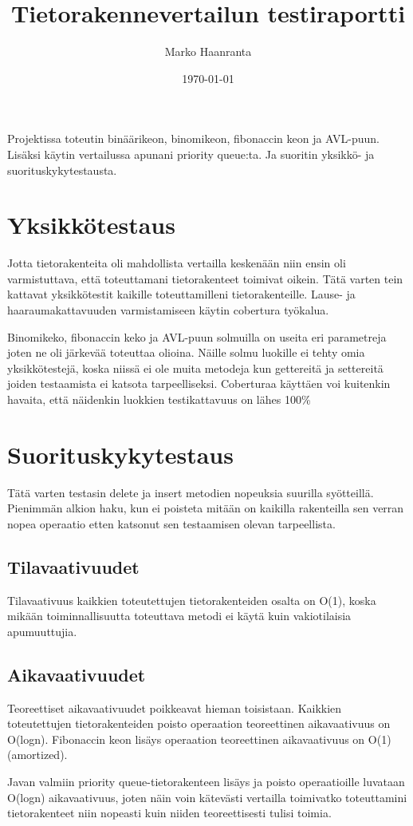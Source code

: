 \documentclass[11pt,a4paper]{article}
\author{Marko Haanranta}
\date{\today}
\title{Tietorakennevertailun testiraportti}
\begin{document}
\maketitle
Projektissa toteutin binäärikeon, binomikeon, fibonaccin keon ja AVL-puun. Lisäksi käytin vertailussa apunani priority queue:ta. 
Ja suoritin yksikkö- ja suorituskykytestausta.
\section{Yksikkötestaus}
Jotta tietorakenteita oli mahdollista vertailla keskenään niin ensin oli varmistuttava, että toteuttamani tietorakenteet toimivat oikein. Tätä varten tein kattavat yksikkötestit kaikille toteuttamilleni tietorakenteille. Lause- ja haaraumakattavuuden varmistamiseen käytin cobertura työkalua.

Binomikeko, fibonaccin keko ja AVL-puun solmuilla on useita eri parametreja joten ne oli järkevää toteuttaa olioina. Näille solmu luokille ei tehty omia yksikkötestejä, koska niissä ei ole muita metodeja kun gettereitä ja settereitä joiden testaamista ei katsota tarpeelliseksi. Coberturaa käyttäen voi kuitenkin havaita, että näidenkin luokkien testikattavuus on lähes 100\%
\section{Suorituskykytestaus}
Tätä varten testasin delete ja insert metodien nopeuksia suurilla syötteillä. Pienimmän alkion haku, kun ei poisteta mitään on kaikilla rakenteilla sen verran nopea operaatio etten katsonut sen testaamisen olevan tarpeellista.
\subsection{Tilavaativuudet}
Tilavaativuus kaikkien toteutettujen tietorakenteiden osalta on O(1), koska mikään toiminnallisuutta toteuttava metodi ei käytä kuin vakiotilaisia apumuuttujia.
\subsection{Aikavaativuudet}
Teoreettiset aikavaativuudet poikkeavat hieman toisistaan. Kaikkien toteutettujen tietorakenteiden poisto operaation teoreettinen aikavaativuus on O(logn). Fibonaccin keon lisäys operaation teoreettinen aikavaativuus on O(1)(amortized). 

Javan valmiin priority queue-tietorakenteen lisäys ja poisto operaatioille luvataan O(logn) aikavaativuus, joten näin voin kätevästi vertailla toimivatko toteuttamini tietorakenteet niin nopeasti kuin niiden teoreettisesti tulisi toimia.
\end{document}
